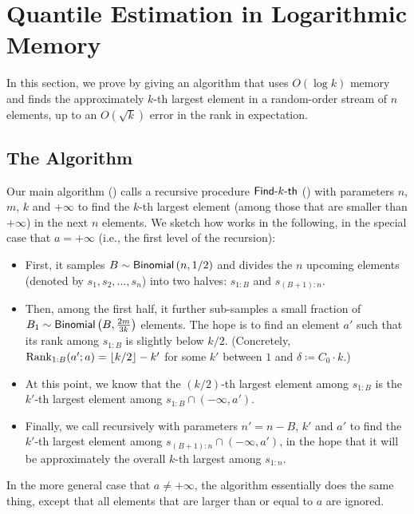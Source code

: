 \section{Quantile Estimation in Logarithmic Memory}\label{section.2}
In this section, we prove  by giving an algorithm that uses $O(\log k)$ memory and finds the approximately $k$-th largest element in a random-order stream of $n$ elements, up to an $O(\sqrt{k})$ error in the rank in expectation.

\subsection{The Algorithm}

Our main algorithm () calls a recursive procedure $\textsf{Find-}k\textsf{-th}$ () with parameters $n$, $m$, $k$ and $+\infty$ to find the $k$-th largest element (among those that are smaller than $+\infty$) in the next $n$ elements. We sketch how  works in the following, in the special case that $a = +\infty$ (i.e., the first level of the recursion):
\begin{itemize}
    \item First, it samples $B \sim \mathsf{Binomial}\left(n, 1/2\right)$ and divides the $n$ upcoming elements (denoted by $s_1, s_2, \ldots, s_n$) into two halves: $s_{1:B}$ and $s_{(B+1):n}$.
    \item Then, among the first half, it further sub-samples a small fraction of $B_1 \sim \mathsf{Binomial}\left(B, \frac{2m}{3k}\right)$ elements. The hope is to find an element $a'$ such that its rank among $s_{1:B}$ is slightly below $k/2$. (Concretely, $\mathrm{Rank}_{1:B}(a'; a) = \lfloor k/2\rfloor - k'$ for some $k'$ between $1$ and $\delta \coloneqq C_0\cdot k$.)
    \item At this point, we know that the $(k/2)$-th largest element among $s_{1:B}$ is the $k'$-th largest element among $s_{1:B} \cap (-\infty, a')$.
    \item Finally, we call  recursively with parameters $n' = n - B$, $k'$ and $a'$ to find the $k'$-th largest element among $s_{(B+1):n} \cap (-\infty, a')$, in the hope that it will be approximately the overall $k$-th largest among $s_{1:n}$.
\end{itemize}

In the more general case that $a \ne +\infty$, the algorithm essentially does the same thing, except that all elements that are larger than or equal to $a$ are ignored.

